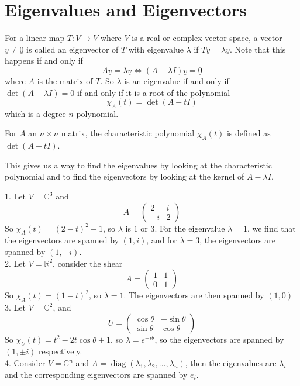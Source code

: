 \section{Eigenvalues and Eigenvectors}
For a linear map $T:V\to V$ where $V$ is a real or complex vector space, a vector $\underline{v}\neq\underline{0}$ is called an eigenvector of $T$ with eigenvalue $\lambda$ if $T\underline{v}=\lambda\underline{v}$.
Note that this happens if and only if
$$A\underline{v}=\lambda\underline{v}\iff (A-\lambda I)\underline{v}=\underline{0}$$
where $A$ is the matrix of $T$.
So $\lambda$ is an eigenvalue if and only if $\det(A-\lambda I)=0$ if and only if it is a root of the polynomial
$$\chi_A(t)=\det(A-tI)$$
which is a degree $n$ polynomial.
\begin{definition}
    For $A$ an $n\times n$ matrix, the characteristic polynomial $\chi_A(t)$ is defined as $\det(A-tI)$.
\end{definition}
This gives us a way to find the eigenvalues by looking at the characteristic polynomial and to find the eigenvectors by looking at the kernel of $A-\lambda I$.
\begin{example}
    1. Let $V=\mathbb C^3$ and
    $$A=\begin{pmatrix}
        2&i\\
        -i&2
    \end{pmatrix}$$
    So $\chi_A(t)=(2-t)^2-1$, so $\lambda$ is $1$ or $3$.
    For the eigenvalue $\lambda=1$, we find that the eigenvectors are spanned by $(1,i)$, and for $\lambda=3$, the eigenvectors are spanned by $(1,-i)$.
    \\
    2. Let $V=\mathbb R^2$, consider the shear
    $$A=
    \begin{pmatrix}
        1&1\\
        0&1
    \end{pmatrix}$$
    So $\chi_A(t)=(1-t)^2$, so $\lambda=1$.
    The eigenvectors are then spanned by $(1,0)$
    \\
    3. Let $V=\mathbb C^2$, and
    $$U=\begin{pmatrix}
        \cos\theta&-\sin\theta\\
        \sin\theta&\cos\theta
    \end{pmatrix}$$
    So $\chi_U(t)=t^2-2t\cos\theta+1$, so $\lambda=e^{\pm i\theta}$, so the eigenvectors are spanned by $(1,\pm i)$ respectively.\\
    4. Consider $V=\mathbb C^n$ and $A=\operatorname{diag}(\lambda_1,\lambda_2,\ldots,\lambda_n)$, then the eigenvalues are $\lambda_i$ and the corresponding eigenvectors are spanned by $\underline{e_i}$.
\end{example}
